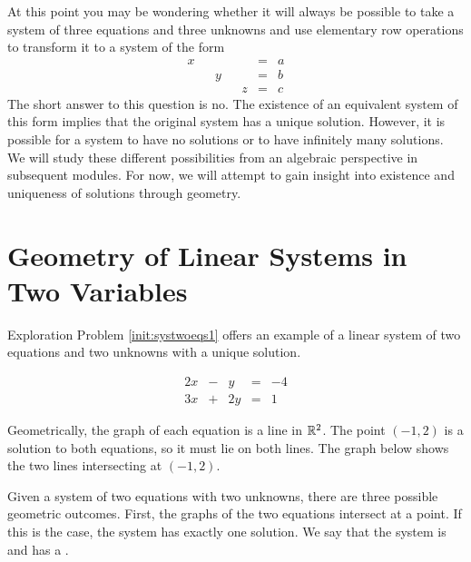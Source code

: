 \documentclass{ximera}
\begin{document}
At this point you may be wondering whether it will always be possible to take a system of three equations and three unknowns and use elementary row operations to transform it to a system of the form
$$\begin{array}{ccccccc}
      x & &&&&= &a \\
	 & &y&&&=&b\\
     & &&&z&=&c
    \end{array}$$
The short answer to this question is no.  The existence of an equivalent system of this form implies that the original system has a unique solution.  However, it is possible for a system to have no solutions or to have infinitely many solutions.  We will study these different possibilities from an algebraic perspective in subsequent modules.  For now, we will attempt to gain insight into existence and uniqueness of solutions through geometry.     

\section*{Geometry of Linear Systems in Two Variables}
Exploration Problem \ref{init:systwoeqs1} offers an example of a linear system of two equations and two unknowns with a unique solution.  

$$\begin{array}{ccccc}
      2x& -&y&=&-4\\
      3x & +&2y&= &1 
    \end{array}$$

Geometrically, the graph of each equation is a line in $\mathbb{R}^2$.  The point $(-1, 2)$ is a solution to both equations, so it must lie on both lines.
  The graph below shows the two lines intersecting at $(-1, 2)$.    
    
\begin{image}[2in]
\end{image}

Given a system of two equations with two unknowns, there are three possible geometric outcomes.  First, the graphs of the two equations intersect at a point.  If this is the case, the system has exactly one solution. We say that the system is  and has a .  
\end{document}
